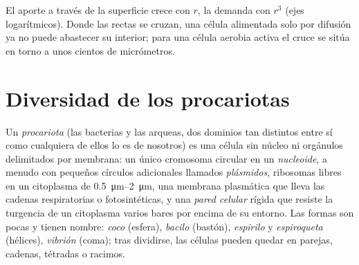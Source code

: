 \begin{omfigure}

{\small El aporte a través de la superficie crece con $r$, la demanda con
$r^3$ (ejes logarítmicos). Donde las rectas se cruzan, una célula
alimentada solo por difusión ya no puede abastecer su interior; para
una célula aerobia activa el cruce se sitúa en torno a unos cientos de
micrómetros.}
\end{omfigure}

\section{Diversidad de los procariotas}

\begin{definition}\label{def:b2:unicellular-diversity:prokaryote}
Un \emph{procariota} (las bacterias y las arqueas, dos
dominios tan distintos entre sí como cualquiera de ellos lo es de
nosotros) es una célula sin núcleo ni orgánulos delimitados por
membrana: un único cromosoma circular en un \emph{nucleoide},
a menudo con pequeños círculos adicionales llamados
\emph{plásmidos}, ribosomas libres en un citoplasma de
\qtyrange{0.5}{2}{\micro m}, una membrana plasmática que lleva las
cadenas respiratorias o fotosintéticas, y una
\emph{pared celular} rígida que resiste
la turgencia de un citoplasma varios bares por encima de su entorno. Las
formas son pocas y tienen nombre: \emph{coco} (esfera), \emph{bacilo}
(bastón), \emph{espirilo} y \emph{espiroqueta} (hélices), \emph{vibrión}
(coma); tras dividirse, las células pueden quedar en parejas, cadenas,
tétradas o racimos.
\end{definition}

